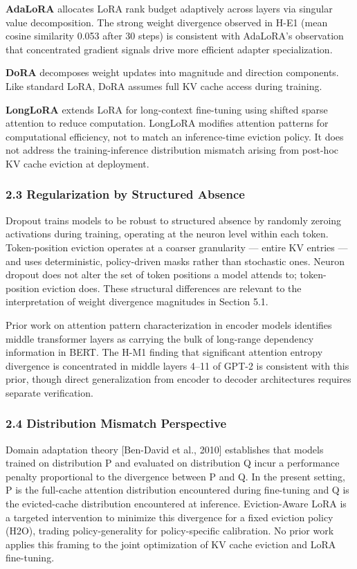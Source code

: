 \textbf{AdaLoRA} \citep{Zhangetal2023} allocates LoRA rank budget adaptively across layers via singular value decomposition. The strong weight divergence observed in H-E1 (mean cosine similarity 0.053 after 30 steps) is consistent with AdaLoRA's observation that concentrated gradient signals drive more efficient adapter specialization.

\textbf{DoRA} \citep{Liuetal2024} decomposes weight updates into magnitude and direction components. Like standard LoRA, DoRA assumes full KV cache access during training.

\textbf{LongLoRA} \citep{Chenetal2023} extends LoRA for long-context fine-tuning using shifted sparse attention to reduce computation. LongLoRA modifies attention patterns for computational efficiency, not to match an inference-time eviction policy. It does not address the training-inference distribution mismatch arising from post-hoc KV cache eviction at deployment.

\subsubsection{2.3 Regularization by Structured Absence}

Dropout \citep{Srivastavaetal2014} trains models to be robust to structured absence by randomly zeroing activations during training, operating at the neuron level within each token. Token-position eviction operates at a coarser granularity — entire KV entries — and uses deterministic, policy-driven masks rather than stochastic ones. Neuron dropout does not alter the set of token positions a model attends to; token-position eviction does. These structural differences are relevant to the interpretation of weight divergence magnitudes in Section 5.1.

Prior work on attention pattern characterization in encoder models \citep{Clarketal2019} identifies middle transformer layers as carrying the bulk of long-range dependency information in BERT. The H-M1 finding that significant attention entropy divergence is concentrated in middle layers 4–11 of GPT-2 is consistent with this prior, though direct generalization from encoder to decoder architectures requires separate verification.

\subsubsection{2.4 Distribution Mismatch Perspective}

Domain adaptation theory [Ben-David et al., 2010] establishes that models trained on distribution P and evaluated on distribution Q incur a performance penalty proportional to the divergence between P and Q. In the present setting, P is the full-cache attention distribution encountered during fine-tuning and Q is the evicted-cache distribution encountered at inference. Eviction-Aware LoRA is a targeted intervention to minimize this divergence for a fixed eviction policy (H2O), trading policy-generality for policy-specific calibration. No prior work applies this framing to the joint optimization of KV cache eviction and LoRA fine-tuning.


